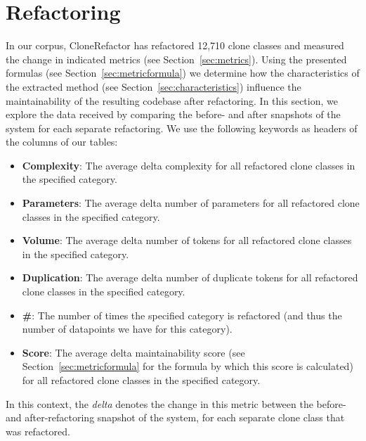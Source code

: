 \section{Refactoring} \label{sec:refactoringexperiments}
In our corpus, CloneRefactor has refactored 12,710 clone classes and measured the change in indicated metrics (see Section~\ref{sec:metrics}). Using the presented formulas (see Section~\ref{sec:metricformula}) we determine how the characteristics of the extracted method (see Section~\ref{sec:characteristics}) %
influence the maintainability of the resulting codebase after refactoring. In this section, we explore the data received by comparing the before- and after snapshots of the system for each separate refactoring. We use the following keywords as headers of the columns of our tables:
\begin{itemize}
  \item \textbf{Complexity}: The average delta complexity for all refactored clone classes in the specified category.
  \item \textbf{Parameters}: The average delta number of parameters for all refactored clone classes in the specified category.
  \item \textbf{Volume}: The average delta number of tokens for all refactored clone classes in the specified category.
  \item \textbf{Duplication}: The average delta number of duplicate tokens for all refactored clone classes in the specified category.
  \item \textbf{\#}: The number of times the specified category is refactored (and thus the number of datapoints we have for this category).
  \item \textbf{Score}: The average delta maintainability score (see Section~\ref{sec:metricformula} for the formula by which this score is calculated) for all refactored clone classes in the specified category.
\end{itemize}
In this context, the \textit{delta} denotes the change in this metric between the before- and after-refactoring snapshot of the system, for each separate clone class that was refactored.

